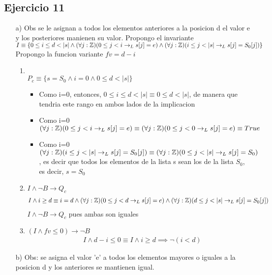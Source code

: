 \documentclass{article}
\begin{document}
\subsection*{Ejercicio 11}
\begin{itemize}
    \item [a) ] Obs se le asignan a todos los elementos anteriores a la posicion d el valor e y los posteriores manienen su valor.
    Propongo el invariante $I\equiv\{0\leq i \leq d<|s|\land (\forall j:\entero)(0\leq j<i\to_L s[j]=e)\land (\forall j:\entero)(i\leq j<|s|\to_L s[j]=S_0[j])\}$\\
    Propongo la funcion variante $fv=d-i$

    \begin{enumerate}
        \item \tuno\\
        $P_c\equiv\{s=S_0\land i=0 \land 0\leq d<|s|\}$
        \begin{itemize}
            \item Como i=0, entonces, $0\leq i \leq d<|s|\equiv 0\leq d<|s|$, de manera que
            tendria este rango en ambos lados de la implicacion
            \item Como i=0 $(\forall j:\mathbb{Z})(0\leq j<i\to_L s[j]=e)\equiv (\forall j:\mathbb{Z})(0\leq j<0\to_L s[j]=e)\equiv True$
            \item Como i=0 $(\forall j:\entero)(i\leq j<|s|\to_L s[j]=S_0[j])\equiv(\forall j:\entero)(0\leq j<|s|\to_L s[j]=S_0)$, es decir que todos
            los elementos de la lista s sean los de la lista $S_0$, es decir, $s=S_0$
        \end{itemize}
        \item $I\land\neg B\to Q_c$
        \cont\begin{align}
            I\land i\geq d &\equiv i=d \land (\forall j:\entero)(0\leq j<d\to_L s[j]=e)\land (\forall j:\entero)(d\leq j<|s|\to_L s[j]=S_0[j])
        \end{align}
        $I\land\neg B\to Q_c$ pues ambas son iguales
        \item $(I\land fv\leq0)\to\neg B$
        \cont\begin{align}
            &I\land d-i\leq0\equiv I\land i\geq d \implies \neg (i<d)
        \end{align}
    \end{enumerate}
    \item [b) ] Obs:  se asigna el valor 'e' a todos los elementos mayores o iguales a la posicion d
    y los anteriores se mantienen igual.\\

\end{itemize}
\end{document}
